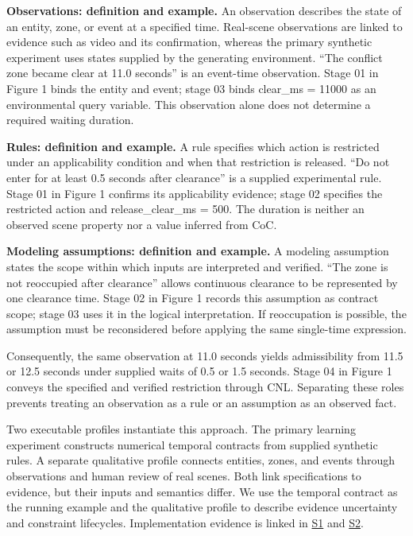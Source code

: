 \documentclass[11pt,a4paper]{article}
\begin{document}
\textbf{Observations: definition and example.} An observation describes the state of an entity, zone, or event at a specified time. Real-scene observations are linked to evidence such as video and its confirmation, whereas the primary synthetic experiment uses states supplied by the generating environment. “The conflict zone became clear at 11.0 seconds” is an event-time observation. Stage 01 in Figure 1 binds the entity and event; stage 03 binds clear\_ms = 11000 as an environmental query variable. This observation alone does not determine a required waiting duration.\par

\textbf{Rules: definition and example.} A rule specifies which action is restricted under an applicability condition and when that restriction is released. “Do not enter for at least 0.5 seconds after clearance” is a supplied experimental rule. Stage 01 in Figure 1 confirms its applicability evidence; stage 02 specifies the restricted action and release\_clear\_ms = 500. The duration is neither an observed scene property nor a value inferred from CoC.\par

\textbf{Modeling assumptions: definition and example.} A modeling assumption states the scope within which inputs are interpreted and verified. “The zone is not reoccupied after clearance” allows continuous clearance to be represented by one clearance time. Stage 02 in Figure 1 records this assumption as contract scope; stage 03 uses it in the logical interpretation. If reoccupation is possible, the assumption must be reconsidered before applying the same single-time expression.\par

Consequently, the same observation at 11.0 seconds yields admissibility from 11.5 or 12.5 seconds under supplied waits of 0.5 or 1.5 seconds. Stage 04 in Figure 1 conveys the specified and verified restriction through CNL. Separating these roles prevents treating an observation as a rule or an assumption as an observed fact.\par

Two executable profiles instantiate this approach. The primary learning experiment constructs numerical temporal contracts from supplied synthetic rules. A separate qualitative profile connects entities, zones, and events through observations and human review of real scenes. Both link specifications to evidence, but their inputs and semantics differ. We use the temporal contract as the running example and the qualitative profile to describe evidence uncertainty and constraint lifecycles. Implementation evidence is linked in \href{\detokenize{../../../../../../projects/04-guardsynth-coc/experiments/paper1_cnl_learning/temporal_preservation.py}}{S1} and \href{\detokenize{../../../../../../platforms/eblc-bcv/src/guard_synth_eblc/action_contract.py}}{S2}.\par
\end{document}
